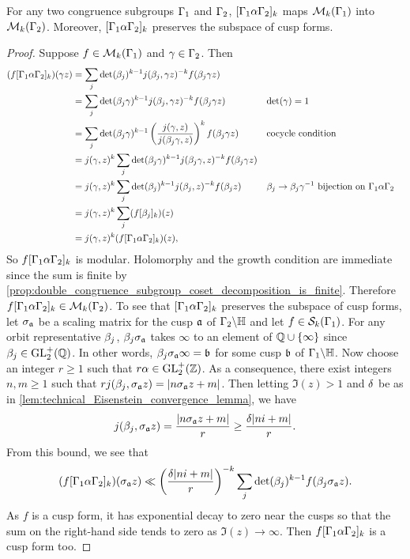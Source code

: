       \begin{proposition}\label{prop:double_coset_operator_preserves_subspaces_modular}
        For any two congruence subgroups $\Gamma_{1}$ and $\Gamma_{2}$, $[\Gamma_{1}\alpha\Gamma_{2}]_{k}$ maps $\mathcal{M}_{k}(\Gamma_{1})$ into $\mathcal{M}_{k}(\Gamma_{2})$. Moreover, $[\Gamma_{1}\alpha\Gamma_{2}]_{k}$ preserves the subspace of cusp forms.
      \end{proposition}
      \begin{proof}
        Suppose $f \in \mathcal{M}_{k}(\Gamma_{1})$ and $\gamma \in \Gamma_{2}$. Then
        \begin{align*}
          (f[\Gamma_{1}\alpha\Gamma_{2}]_{k})(\gamma z) &= \sum_{j}\det(\beta_{j})^{k-1}j(\beta_{j},\gamma z)^{-k}f(\beta_{j}\gamma z) \\
          &= \sum_{j}\det(\beta_{j}\gamma)^{k-1}j(\beta_{j},\gamma z)^{-k}f(\beta_{j}\gamma z) && \text{$\det(\gamma) = 1$} \\
          &= \sum_{j}\det(\beta_{j}\gamma)^{k-1}\left(\frac{j(\gamma,z)}{j(\beta_{j}\gamma,z)}\right)^{k}f(\beta_{j}\gamma z) && \text{cocycle condition} \\
          &= j(\gamma,z)^{k}\sum_{j}\det(\beta_{j}\gamma)^{k-1}j(\beta_{j}\gamma,z)^{-k}f(\beta_{j}\gamma z) \\
          &= j(\gamma,z)^{k}\sum_{j}\det(\beta_{j})^{k-1}j(\beta_{j},z)^{-k}f(\beta_{j}z) && \text{$\beta_{j} \to \beta_{j}\gamma^{-1}$ bijection on $\Gamma_{1}\alpha\Gamma_{2}$} \\
          &= j(\gamma,z)^{k}\sum_{j}(f[\beta_{j}]_{k})(z) \\
          &= j(\gamma,z)^{k}(f[\Gamma_{1}\alpha\Gamma_{2}]_{k})(z),
        \end{align*}
        So $f[\Gamma_{1}\alpha\Gamma_{2}]_{k}$ is modular. Holomorphy and the growth condition are immediate since the sum is finite by \cref{prop:double_congruence_subgroup_coset_decomposition_is_finite}. Therefore $f[\Gamma_{1}\alpha\Gamma_{2}]_{k} \in \mathcal{M}_{k}(\Gamma_{2})$. To see that $[\Gamma_{1}\alpha\Gamma_{2}]_{k}$ preserves the subspace of cusp forms, let $\sigma_{\mathfrak{a}}$ be a scaling matrix for the cusp $\mathfrak{a}$ of $\Gamma_{2}\backslash\mathbb{H}$ and let $f \in \mathcal{S}_{k}(\Gamma_{1})$. For any orbit representative $\beta_{j}$, $\beta_{j}\sigma_{\mathfrak{a}}$ takes $\infty$ to an element of $\mathbb{Q} \cup \{\infty\}$ since $\beta_{j} \in \mathrm{GL}_{2}^{+}(\mathbb{Q})$. In other words, $\beta_{j}\sigma_{\mathfrak{a}}\infty = \mathfrak{b}$ for some cusp $\mathfrak{b}$ of $\Gamma_{1}\backslash\mathbb{H}$. Now choose an integer $r \ge 1$ such that $r\alpha \in \mathrm{GL}_{2}^{+}(\mathbb{Z})$. As a consequence, there exist integers $n,m \ge 1$ such that $rj(\beta_{j},\sigma_{\mathfrak{a}}z) = |n\sigma_{\mathfrak{a}}z+m|$. Then letting $\Im(z) > 1$ and $\delta$ be as in \cref{lem:technical_Eisenstein_convergence_lemma}, we have
        \[
          j(\beta_{j},\sigma_{\mathfrak{a}}z) = \frac{|n\sigma_{\mathfrak{a}}z+m|}{r} \ge \frac{\delta|ni+m|}{r}.
        \]
        From this bound, we see that
        \[
          (f[\Gamma_{1}\alpha\Gamma_{2}]_{k})(\sigma_{\mathfrak{a}}z) \ll \left(\frac{\delta|ni+m|}{r}\right)^{-k}\sum_{j}\det(\beta_{j})^{k-1}f(\beta_{j}\sigma_{\mathfrak{a}} z).
        \]
        As $f$ is a cusp form, it has exponential decay to zero near the cusps so that the sum on the right-hand side tends to zero as $\Im(z) \to \infty$. Then $f[\Gamma_{1}\alpha\Gamma_{2}]_{k}$ is a cusp form too.
      \end{proof}

